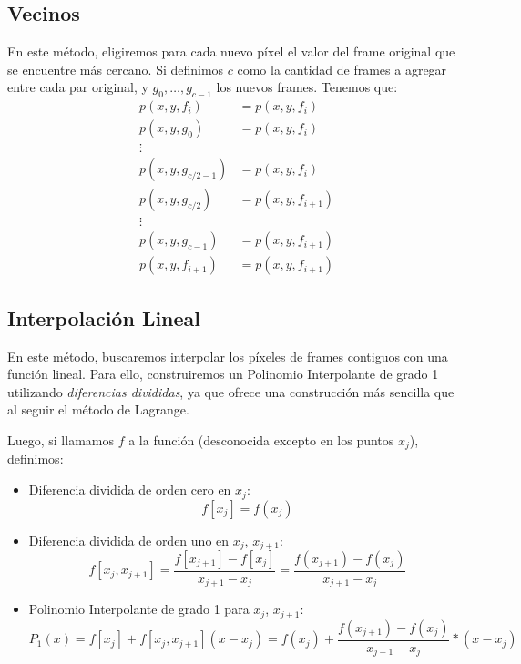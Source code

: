 \subsection{Vecinos}\label{Vecinos}
En este método, eligiremos para cada nuevo píxel el valor del frame original que se encuentre
más cercano.
Si definimos $c$ como la cantidad de frames a agregar entre cada par original, y
$g_0, \dots, g_{c-1}$ los nuevos frames. Tenemos que:
\begin{equation*}
    \begin{aligned}
        p(x,y,f_{i}) &= p(x,y,f_{i})\\
        p(x,y,g_{0}) &= p(x,y,f_{i})\\
        \vdots\\
        p(x,y,g_{c/2-1}) &= p(x,y,f_{i})\\
        p(x,y,g_{c/2}) &= p(x,y,f_{i+1})\\
        \vdots\\
        p(x,y,g_{c-1}) &= p(x,y,f_{i+1})\\
        p(x,y,f_{i+1}) &= p(x,y,f_{i+1})
    \end{aligned}
\end{equation*}

\subsection{Interpolación Lineal}\label{Lineal}
En este método, buscaremos interpolar los píxeles de frames contiguos con una función
lineal. Para ello, construiremos un Polinomio Interpolante de grado 1 utilizando
\textit{diferencias divididas}, ya que ofrece una construcción más sencilla que al seguir
el método de Lagrange.

Luego, si llamamos $f$ a la función (desconocida excepto en los puntos $x_j$), definimos:
\begin{itemize}
    \item Diferencia dividida de orden cero en $x_j$:
        \begin{equation*}
            f[x_j] = f(x_j)
        \end{equation*}
    \item Diferencia dividida de orden uno en $x_j$, $x_{j+1}$:
        \begin{equation*}
            f[x_j,x_{j+1}]= \frac{f[x_{j+1}] - f[x_j]}{x_{j+1} - x_j} = \frac{f(x_{j+1}) - f(x_j)}{x_{j+1} - x_j}
        \end{equation*}
    \item Polinomio Interpolante de grado 1 para $x_j$, $x_{j+1}$:
        \begin{equation*}
            P_1(x) = f[x_j] + f[x_j,x_{j+1}](x-x_j) = f(x_j) + \frac{f(x_{j+1}) - f(x_j)}{x_{j+1} - x_j}*(x-x_j)
        \end{equation*}
\end{itemize}

